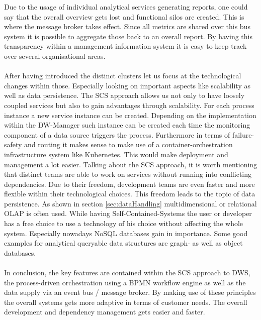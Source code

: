 Due to the usage of individual analytical services generating reports, one could say that the overall overview gets lost and functional silos are created. This is where the message broker takes effect. Since all metrics are shared over this bus system it is possible to aggregate those back to an overall report. By having this transparency within a management information system it is easy to keep track over several organisational areas. \newline
\\
\\
After having introduced the distinct clusters let us focus at the technological changes within those. Especially looking on important aspects like scalability as well as data persistence.\newline
The SCS approach allows us not only to have loosely coupled services but also to gain advantages through scalability. For each process instance a new service instance can be created. Depending on the implementation within the DW-Manager such instance can be created each time the monitoring component of a data source triggers the process. Furthermore in terms of failure-safety and routing it makes sense to make use of a container-orchestration infrastructure system like Kubernetes. This would make deployment and management a lot easier.\newline 
Talking about the SCS approach, it is worth mentioning that distinct teams are able to work on services without running into conflicting dependencies. Due to their freedom, development teams are even faster and more flexible within their technological choices.\newline
This freedom leads to the topic of data persistence. As shown in section \ref{sec:dataHandling} multidimensional or relational OLAP is often used. While having Self-Contained-Systems the user or developer has a free choice to use a technology of his choice without affecting the whole system. Especially nowadays NoSQL databases gain in importance. Some good examples for analytical queryable data structures are graph- as well as object databases. 
\\
\\
In conclusion, the key features are contained within the SCS approach to DWS, the process-driven orchestration using a BPMN workflow engine as well as the data supply via an event bus / message broker. By making use of these principles the overall systems gets more adaptive in terms of customer needs. The overall development and dependency management gets easier and faster. \newline
